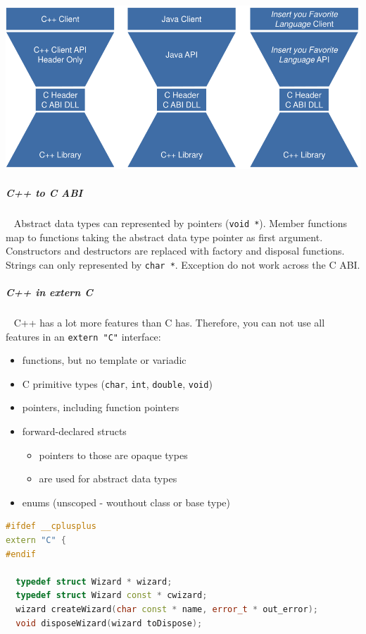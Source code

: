 \documentclass[11pt,twoside,landscape]{article}
\begin{document}
\begin{multicols}{2}
{
\begin{center}
\includegraphics[width=.9\linewidth]{img/hourglass_interface.png}
\end{center}
\label{fig:hourglass-interface-idea}
}
\subparagraph{C++ to C ABI} \
\label{sec:orgace362e}
Abstract data types can represented by pointers (\texttt{void *}).
Member functions map to functions taking the abstract data type pointer as first argument.
Constructors and destructors are replaced with factory and disposal functions.
Strings can only represented by \texttt{char *}.
Exception do not work across the C ABI.

\subparagraph{C++ in extern C} \
\label{sec:orgc1b7473}
C++ has a lot more features than C has.
Therefore, you can not use all features in an \texttt{extern "C"} interface:

\begin{itemize}
\item functions, but no template or variadic
\item C primitive types (\texttt{char}, \texttt{int}, \texttt{double}, \texttt{void})
\item pointers, including function pointers
\item forward-declared structs
\begin{itemize}
\item pointers to those are opaque types
\item are used for abstract data types
\end{itemize}
\item enums (unscoped - wouthout class or base type)
\end{itemize}


\begin{lstlisting}[language=c++,label=lst:orgd76726d,caption={Example for a extern C interface},captionpos=b,numbers=none]
#ifdef __cplusplus
extern "C" {
#endif

  typedef struct Wizard * wizard;
  typedef struct Wizard const * cwizard;
  wizard createWizard(char const * name, error_t * out_error);
  void disposeWizard(wizard toDispose);


\end{lstlisting}
\end{multicols}
\end{document}
